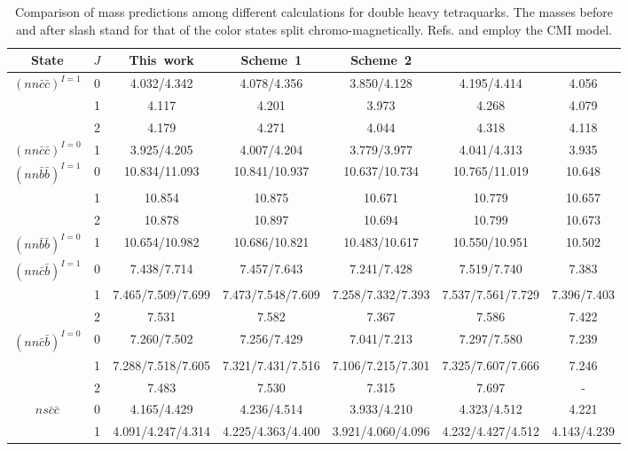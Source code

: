 \documentclass[prd,twocolumn,floatfix,nofootinbib]{revtex4}
\begin{document}
\renewcommand{\tabcolsep}{0.06cm} \renewcommand{\arraystretch}{1.3}
\begin{table}[!htb]
\caption{Comparison of mass predictions among different calculations for
double heavy tetraquarks. The masses before and after slash stand for that
of the color states split chromo-magnetically. Refs.\protect\cite%
{Luo:2017eub} and \protect\cite{Lu:2020rog} employ the CMI model. }
\label{tab:comparison}%
\begin{tabular}{ccccccc}
\hline\hline
\textrm{State} & $J$ & \textrm{This\ work} & \textrm{Scheme\ 1}\cite%
{Luo:2017eub} & \textrm{Scheme\ 2}\cite{Luo:2017eub} & \cite{Lu:2020rog} &
\cite{Ebert:2007rn} \\ \hline
${(nn\bar{c}\bar{c})}^{I=1}$ & 0 & 4.032/4.342 & 4.078/4.356 & 3.850/4.128 &
4.195/4.414 & 4.056 \\
& 1 & 4.117 & 4.201 & 3.973 & 4.268 & 4.079 \\
& 2 & 4.179 & 4.271 & 4.044 & 4.318 & 4.118 \\
${(nn\bar{c}\bar{c})}^{I=0}$ & 1 & 3.925/4.205 & 4.007/4.204 & 3.779/3.977 &
4.041/4.313 & 3.935 \\
${(nn\bar{b}\bar{b})}^{I=1}$ & 0 & 10.834/11.093 & 10.841/10.937 &
10.637/10.734 & 10.765/11.019 & 10.648 \\
& 1 & 10.854 & 10.875 & 10.671 & 10.779 & 10.657 \\
& 2 & 10.878 & 10.897 & 10.694 & 10.799 & 10.673 \\
${(nn\bar{b}\bar{b})}^{I=0}$ & 1 & 10.654/10.982 & 10.686/10.821 &
10.483/10.617 & 10.550/10.951 & 10.502 \\
${(nn\bar{c}\bar{b})}^{I=1}$ & 0 & 7.438/7.714 & 7.457/7.643 & 7.241/7.428 &
7.519/7.740 & 7.383 \\
& 1 & 7.465/7.509/7.699 & 7.473/7.548/7.609 & 7.258/7.332/7.393 &
7.537/7.561/7.729 & 7.396/7.403 \\
& 2 & 7.531 & 7.582 & 7.367 & 7.586 & 7.422 \\
${(nn\bar{c}\bar{b})}^{I=0}$ & 0 & 7.260/7.502 & 7.256/7.429 & 7.041/7.213 &
7.297/7.580 & 7.239 \\
& 1 & 7.288/7.518/7.605 & 7.321/7.431/7.516 & 7.106/7.215/7.301 &
7.325/7.607/7.666 & 7.246 \\
& 2 & 7.483 & 7.530 & 7.315 & 7.697 & - \\
$ns\bar{c}\bar{c}$ & 0 & 4.165/4.429 & 4.236/4.514 & 3.933/4.210 &
4.323/4.512 & 4.221 \\
& 1 & 4.091/4.247/4.314 & 4.225/4.363/4.400 & 3.921/4.060/4.096 &
4.232/4.427/4.512 & 4.143/4.239 \\

\end{tabular}
\end{table}
\end{document}
